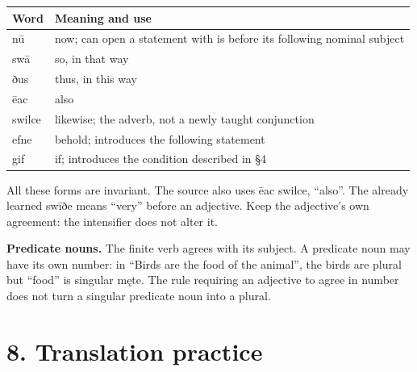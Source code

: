 \par\begingroup
\fontsize{10.5}{13.2}\selectfont
\setlength{\LTleft}{0pt}\setlength{\LTright}{\fill}
\noindent
\begin{tabular}{@{}>{\raggedright\arraybackslash}p{25.49mm}>{\raggedright\arraybackslash}p{95.7mm}@{}}
\toprule
\textbf{Word} & \textbf{Meaning and use} \\
\midrule
nū & now; can open a statement with is before its following nominal subject \\
swā & so, in that way \\
ðus & thus, in this way \\
ēac & also \\
swilce & likewise; the adverb, not a newly taught conjunction \\
efne & behold; introduces the following statement \\
gif & if; introduces the condition described in §4 \\
\bottomrule
\end{tabular}
\par\endgroup

All these forms are invariant. The source also uses ēac swilce, “also”. The already learned swīðe means “very” before an adjective. Keep the adjective’s own agreement: the intensifier does not alter it.

\textbf{Predicate nouns.} The finite verb agrees with its subject. A predicate noun may have its own number: in “Birds are the food of the animal”, the birds are plural but “food” is singular męte. The rule requiring an adjective to agree in number does not turn a singular predicate noun into a plural.

\section*{8. Translation practice}

